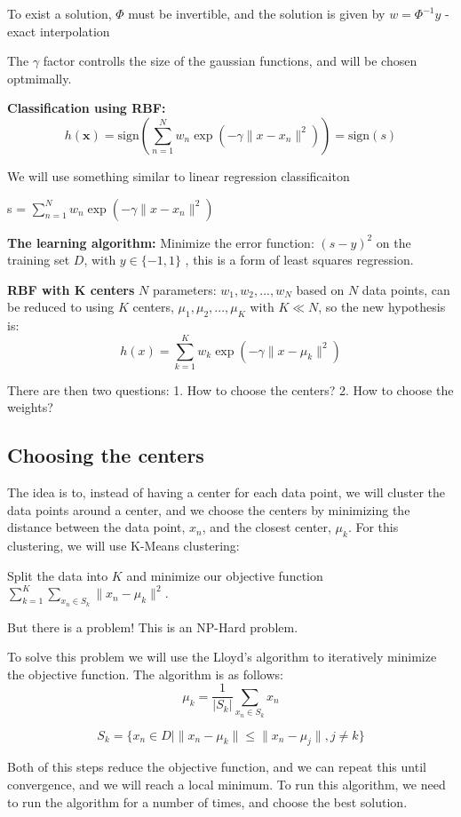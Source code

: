 To exist a solution, $\Phi$ must be invertible, and the solution is given by $w = \Phi^{-1} y$ - exact interpolation 

The $\gamma$ factor controlls the size of the gaussian functions, and will be chosen optmimally.

\textbf{Classification using RBF:}
$$
h(\textbf{x}) = \text{sign}\left(\sum_{n=1}^N w_n\exp\left(-\gamma\|x - x_n \|^2\right)\right) = \text{sign}(s)
$$

We will use something similar to linear regression classificaiton

s = $\sum_{n=1}^N w_n\exp\left(-\gamma\|x - x_n \|^2\right)$

\textbf{The learning algorithm:}
Minimize the error function: $(s - y)^2$ on the training set $D$, with $y \in \{-1, 1\}$ , this is a form of least squares regression.

\textbf{RBF with K centers}
$N$ parameters: $w_1, w_2, ..., w_N$ based on $N$ data points, can be reduced to using $K$ centers, $\mu_1, \mu_2, ..., \mu_K$ with $K \ll N$, so the new hypothesis is:
$$
h(x) = \sum_{k=1}^K w_k\exp\left(-\gamma\|x - \mu_k \|^2\right)
$$

There are then two questions:
1. How to choose the centers?
2. How to choose the weights?

\subsection{Choosing the centers}
The idea is to, instead of having a center for each data point, we will cluster the data points around a center, and we choose the centers by minimizing the distance between the data point, $x_n$, and the closest center, $\mu_k$. For this clustering, we will use K-Means clustering:

Split the data into $K$ and minimize our objective function $\sum_{k=1}^K\sum_{x_n \in S_k}\|x_n - \mu_k\|^2$.

But there is a problem! This is an NP-Hard problem.

To solve this problem we will use the Lloyd's algorithm to iteratively minimize the objective function. The algorithm is as follows:
$$
\mu_k = \frac{1}{|S_k|}\sum_{x_n \in S_k} x_n
$$

$$
S_k = \{ x_n \in D | \|x_n - \mu_k\| \leq \|x_n - \mu_j\|, j \neq k \}
$$

Both of this steps reduce the objective function, and we can repeat this until convergence, and we will reach a local minimum. 
To run this algorithm, we need to run the algorithm for a number of times, and choose the best solution.

